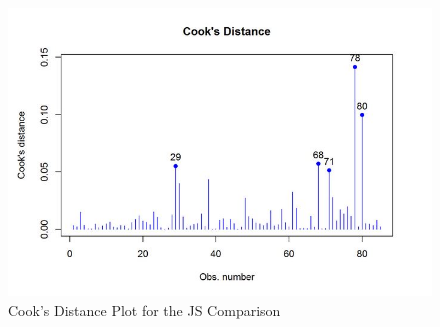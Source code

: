 \documentclass[12pt, a4paper]{report}
\theoremstyle{plain}
\theoremstyle{definition}
\theoremstyle{remark}
\begin{document}
\begin{figure}[h!]
	\centering
	\includegraphics[width=0.99\linewidth]{images/CooksDistancePlot-JS-Roy}
	\caption{Cook's Distance Plot for the JS Comparison}
	\label{fig:CooksDistancePlot-JS-Roy}
\end{figure}	
	
	

	
	
	
%
%	
%	
%	
	










%		
%		
\end{document}
